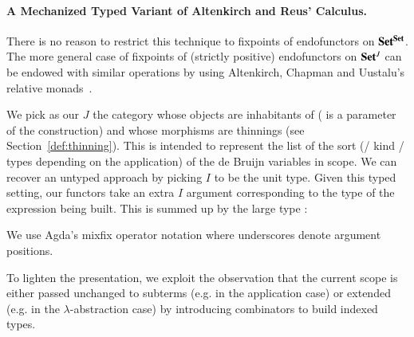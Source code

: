 \paragraph{A Mechanized Typed Variant of Altenkirch and Reus' Calculus.}\label{section:mech-reus}

There is no reason to restrict this technique to fixpoints of endofunctors
on $\mathbf{Set}{}^{\mathbf{Set}{}}$. The more general
case of fixpoints of (strictly positive) endofunctors on $\mathbf{Set}{}^J$ can be
endowed with similar operations by using Altenkirch, Chapman and
Uustalu's relative monads~\citeyear{Altenkirch2010, JFR4389}.

We pick as our $J$ the category whose objects are inhabitants of
  ( is a parameter of the construction) and whose morphisms are
thinnings (see Section~\ref{def:thinning}).  This   is
intended to represent the list of the sort (/ kind / types depending
on the application) of the de Bruijn variables in scope. We can
recover an untyped approach by picking $I$ to be the unit type.  Given
this typed setting, our functors take an extra $I$ argument
corresponding to the type of the expression being built. This is
summed up by the large type 
:%

\begin{center}
\end{center}

We use Agda's mixfix operator notation where underscores denote
argument positions.

To lighten the presentation, we exploit the observation that the
current scope is either passed unchanged to subterms (e.g. in the application case)
or extended (e.g. in the $\lambda$-abstraction case) by introducing combinators
to build indexed types.

\begin{center}
\begin{minipage}{0.4\textwidth}
\end{minipage}\hfill
\begin{minipage}{0.5\textwidth}
\end{minipage}
\newline
\begin{minipage}{0.40\textwidth}
\end{minipage}\hfill
\begin{minipage}{0.25\textwidth}
\end{minipage}\hfill
\begin{minipage}{0.25\textwidth}
\end{minipage}
\end{center}

